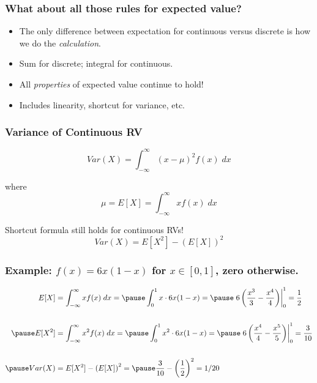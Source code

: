 \begin{frame}
\frametitle{What about all those rules for expected value?}
\begin{itemize}
  \item The only difference between expectation for continuous versus discrete is how we do the \emph{calculation}.
  \item Sum for discrete; integral for continuous.
  \item All \emph{properties} of expected value \alert{continue to hold!}
  \item Includes linearity, shortcut for variance, etc.
\end{itemize}
\end{frame}

\begin{frame}
\frametitle{Variance of Continuous RV}

$$\boxed{Var(X) = \int_{-\infty}^{\infty} (x - \mu)^2 f(x) \; dx}$$

\vspace{2em}
where
$$\mu = E[X]=\int_{-\infty}^\infty x f(x) \; dx $$

\vspace{2em}
\alert{Shortcut formula still holds for continuous RVs!}
	$$Var(X) = E[X^2] - \left(E[X]\right)^2$$
\end{frame}
\begin{frame}
  \frametitle{Example: $f(x) = 6x(1-x)$ for $x \in [0,1]$, zero otherwise.}

  \small
    \begin{align*}
      E[X] &= \int_{-\infty}^{\infty} x f(x)\; dx =\pause \int_0^1 x \cdot 6x(1-x) =\pause \left. 6\left( \frac{x^3}{3} - \frac{x^4}{4} \right)\right|_{0}^1 = \frac{1}{2}\\ \\ 
      \pause
      E[X^2] &= \int_{-\infty}^{\infty} x^2 f(x)\; dx =\pause \int_0^1 x^2 \cdot 6x(1-x) = \pause \left. 6\left( \frac{x^4}{4} - \frac{x^5}{5} \right) \right|_0^1 = \frac{3}{10} \\ \\ 
      \pause
      Var(X) &= E[X^2] - \left(E[X]\right)^2 = \pause \frac{3}{10} - \left( \frac{1}{2} \right)^2 = 1/20 
    \end{align*}

\end{frame}
